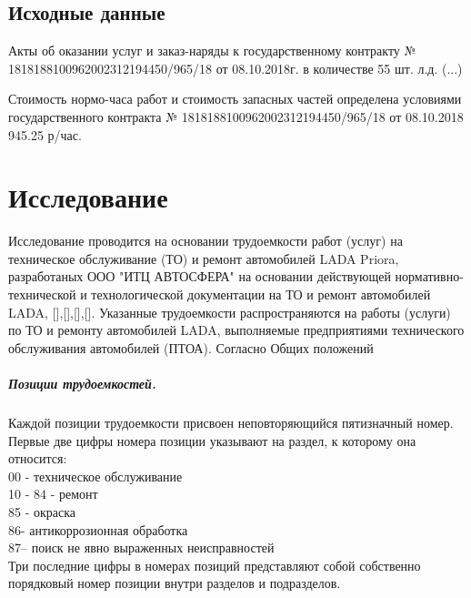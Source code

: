 \subsection{Исходные данные}

Акты об оказании услуг и заказ-наряды к государственному контракту № 1818188100962002312194450/965/18 от 08.10.2018г. в количестве 55 шт. л.д. (...)

Стоимость  нормо-часа работ и стоимость запасных частей определена условиями государственного контракта  № 1818188100962002312194450/965/18 от 08.10.2018 945.25 р/час.\\

   \pagebreak      
% 
%
%
\section{Исследование}

Исследование проводится на основании  трудоемкости работ (услуг) на техническое обслуживание (ТО) и ремонт автомобилей LADA
Priora, разработаных ООО "ИТЦ АВТОСФЕРА" на основании действующей нормативно-технической и
технологической документации на ТО и ремонт автомобилей LADA, [],[],[],[].  Указанные трудоемкости  распространяются на работы (услуги) по ТО и ремонту автомобилей LADA, выполняемые
предприятиями технического обслуживания автомобилей (ПТОА).  Согласно Общих положений 


\subparagraph{Позиции трудоемкостей.} Каждой позиции трудоемкости присвоен неповторяющийся пятизначный номер. Первые две цифры
номера позиции указывают на раздел, к которому она относится:\\
00 - техническое обслуживание\\
10 - 84 - ремонт\\
85 - окраска\\
86- антикоррозионная обработка\\
87– поиск не явно выраженных неисправностей\\
Три последние цифры в номерах позиций представляют собой собственно порядковый номер позиции
внутри разделов и подразделов.

